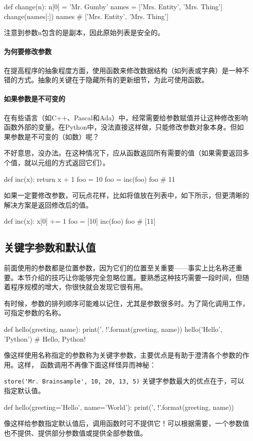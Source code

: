 \begin{pyc}
def change(n):
    n[0] = 'Mr. Gumby'
names = ['Mrs. Entity', 'Mrs. Thing']
change(names[:])
names  # ['Mrs. Entity', 'Mrs. Thing'] 
\end{pyc}
注意到参数n包含的是副本，因此原始列表是安全的。
\paragraph{为何要修改参数} 在提高程序的抽象程度方面，使用函数来修改数据结构（如列表或字典）是一种不错的方式。抽象的关键在于隐藏所有的更新细节，为此可使用函数。

\paragraph{如果参数是不可变的} 在有些语言（如C++、Pascal和Ada）中，经常需要给参数赋值并让这种修改影响函数外部的变量。在Python中，没法直接这样做，只能修改参数对象本身。但如果参数是不可变的（如数）呢？

不好意思，没办法。在这种情况下，应从函数返回所有需要的值（如果需要返回多个值，就以元组的方式返回它们）。

\begin{pyc}
    def inc(x): return x + 1
    foo = 10
    foo = inc(foo)
    foo  # 11
    \end{pyc}

如果一定要修改参数，可玩点花样，比如将值放在列表中，如下所示，但更清晰的解决方案是返回修改后的值。
\begin{pyc}
def inc(x): x[0] += 1
foo = [10]
inc(foo)
foo  # [11]
\end{pyc}
\subsection{关键字参数和默认值}
前面使用的参数都是位置参数，因为它们的位置至关重要——事实上比名称还重要。本节介绍的技巧让你能够完全忽略位置。要熟悉这种技巧需要一段时间，但随着程序规模的增大，你很快就会发现它很有用。

有时候，参数的排列顺序可能难以记住，尤其是参数很多时。为了简化调用工作，可指定参数的名称。
\begin{pyc}
def hello(greeting, name):
    print('{}, {}!'.format(greeting, name))
hello('Hello', 'Python')  # Hello, Python!
\end{pyc}
像这样使用名称指定的参数称为关键字参数，主要优点是有助于澄清各个参数的作用。这样，
函数调用不再像下面这样怪异而神秘：

\verb|store('Mr. Brainsample', 10, 20, 13, 5)|
关键字参数最大的优点在于，可以指定默认值。
\begin{pyc}
def hello(greeting='Hello', name='World'):
    print('{}, {}!'.format(greeting, name))
\end{pyc}
像这样给参数指定默认值后，调用函数时可不提供它！可以根据需要，一个参数值也不提供、提供部分参数值或提供全部参数值。

